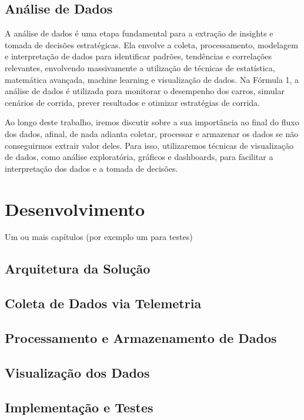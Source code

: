 \documentclass[12pt, %
openright, 
oneside, %
a4paper,    %
brazil]{facom-ufu-abntex2}
\begin{document}
\section{Análise de Dados}

A análise de dados é uma etapa fundamental para a extração de insights e tomada de decisões estratégicas. Ela envolve a coleta, processamento, modelagem e interpretação de dados para identificar padrões, tendências e correlações relevantes,
envolvendo massivamente a utilização de técnicas de estatística, matemática avançada, machine learning e visualização de dados.
Na Fórmula 1, a análise de dados é utilizada para monitorar o desempenho dos carros, simular cenários de corrida, prever resultados e otimizar estratégias de corrida.

Ao longo deste trabalho, iremos discutir sobre a sua importância ao final do fluxo dos dados, afinal, de nada adianta coletar, processar e armazenar os dados se não conseguirmos extrair valor deles. Para isso, utilizaremos técnicas de visualização de dados, como
análise exploratória, gráficos e dashboards, para facilitar a interpretação dos dados e a tomada de decisões.


\chapter{Desenvolvimento}
Um ou mais capítulos (por exemplo um para testes)
\section{Arquitetura da Solução}
\section{Coleta de Dados via Telemetria}
\section{Processamento e Armazenamento de Dados}
\section{Visualização dos Dados}
\section{Implementação e Testes}
\end{document}
